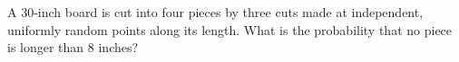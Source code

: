 A $30$-inch board is cut into four pieces by three cuts made at independent, uniformly random points along its length. What is the probability that no piece is longer than $8$ inches?
